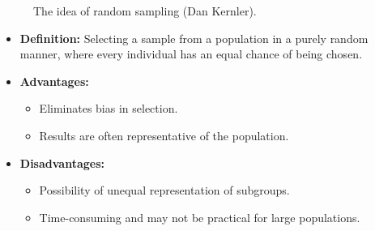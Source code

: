 \documentclass[
  a4paper,
]{scrbook}
\providecommand{\tightlist}{%
  \setlength{\itemsep}{0pt}\setlength{\parskip}{0pt}}\usepackage{longtable,booktabs,array}
\begin{document}
\begin{figure}[H]


\caption{\label{fig-rand-smpl}The idea of random sampling (Dan
Kernler).}

\end{figure}%

\begin{itemize}
\tightlist
\item
  \textbf{Definition:} Selecting a sample from a population in a purely
  random manner, where every individual has an equal chance of being
  chosen.
\item
  \textbf{Advantages:}

  \begin{itemize}
  \tightlist
  \item
    Eliminates bias in selection.
  \item
    Results are often representative of the population.
  \end{itemize}
\item
  \textbf{Disadvantages:}

  \begin{itemize}
  \tightlist
  \item
    Possibility of unequal representation of subgroups.
  \item
    Time-consuming and may not be practical for large populations.
  \end{itemize}
\end{itemize}
\end{document}
